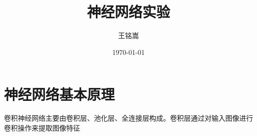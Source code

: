 \documentclass{article}
\title{神经网络实验}
\author{王铭嵩}
\date{\today}
\begin{document}
\maketitle
\newpage
\section{神经网络基本原理}
卷积神经网络主要由卷积层、池化层、全连接层构成。卷积层通过对输入图像进行卷积操作来提取图像特征
\end{document}
